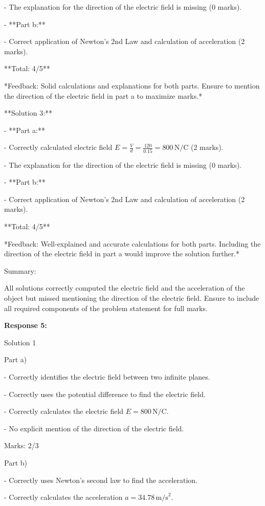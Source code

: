 \documentclass[a4paper,11pt]{article}
\begin{document}
  - The explanation for the direction of the electric field is missing (0 marks).

- **Part b:**

  - Correct application of Newton’s 2nd Law and calculation of acceleration (2 marks).

**Total: 4/5**

*Feedback: Solid calculations and explanations for both parts. Ensure to mention the direction of the electric field in part a to maximize marks.*

**Solution 3:**

- **Part a:**

  - Correctly calculated electric field \(E = \frac{V}{d} = \frac{120}{0.15} = 800 \, \text{N/C}\) (2 marks).
  
  - The explanation for the direction of the electric field is missing (0 marks).

- **Part b:**

  - Correct application of Newton’s 2nd Law and calculation of acceleration (2 marks).

**Total: 4/5**

*Feedback: Well-explained and accurate calculations for both parts. Including the direction of the electric field in part a would improve the solution further.*

Summary:

All solutions correctly computed the electric field and the acceleration of the object but missed mentioning the direction of the electric field. Ensure to include all required components of the problem statement for full marks.

\bigskip
\textbf{Response 5:}

Solution 1

Part a)

- Correctly identifies the electric field between two infinite planes.

- Correctly uses the potential difference to find the electric field.

- Correctly calculates the electric field \( E = 800 \, \text{N/C} \).

- No explicit mention of the direction of the electric field.

Marks: 2/3

Part b)

- Correctly uses Newton’s second law to find the acceleration.

- Correctly calculates the acceleration \( a = 34.78 \, \text{m/s}^2 \).
\end{document}
